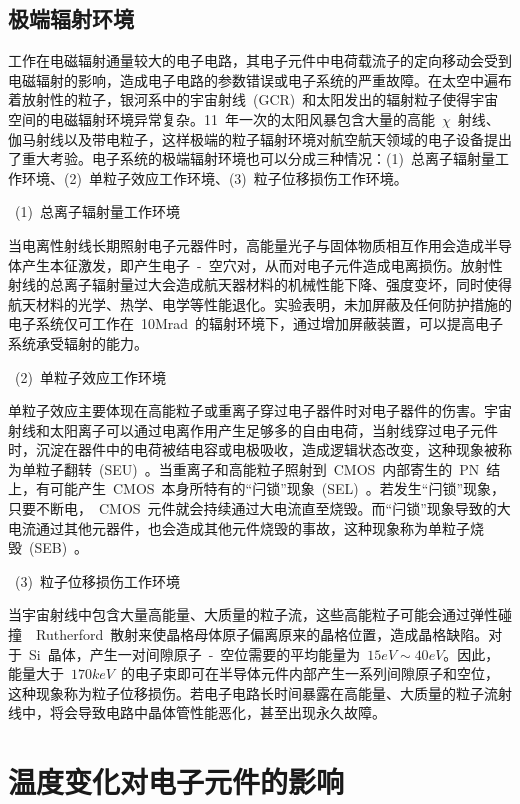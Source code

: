 \subsection{极端辐射环境}
\label{sub:chap2:radiation}
工作在电磁辐射通量较大的电子电路，其电子元件中电荷载流子的定向移动会受到电磁辐射的影响，造成电子电路的参数错误或电子系统的严重故障\cite{Stassinopoulos1988Space,Li2005SpaceRadiation}。在太空中遍布着放射性的粒子，银河系中的宇宙射线~(GCR)~和太阳发出的辐射粒子使得宇宙空间的电磁辐射环境异常复杂。11~年一次的太阳风暴包含大量的高能~$\chi$~射线、伽马射线以及带电粒子\cite{Dodd2010Current}，这样极端的粒子辐射环境对航空航天领域的电子设备提出了重大考验。电子系统的极端辐射环境也可以分成三种情况：(1)~总离子辐射量工作环境、(2)~单粒子效应工作环境、(3)~粒子位移损伤工作环境。

~(1)~总离子辐射量工作环境

当电离性射线长期照射电子元器件时，高能量光子与固体物质相互作用会造成半导体产生本征激发，即产生电子~-~空穴对，从而对电子元件造成电离损伤。放射性射线的总离子辐射量过大会造成航天器材料的机械性能下降、强度变坏，同时使得航天材料的光学、热学、电学等性能退化。实验表明\cite{Son2010GaN}，未加屏蔽及任何防护措施的电子系统仅可工作在~10Mrad~的辐射环境下，通过增加屏蔽装置，可以提高电子系统承受辐射的能力。

~(2)~单粒子效应工作环境

单粒子效应主要体现在高能粒子或重离子穿过电子器件时对电子器件的伤害。宇宙射线和太阳离子可以通过电离作用产生足够多的自由电荷，当射线穿过电子元件时，沉淀在器件中的电荷被结电容或电极吸收，造成逻辑状态改变，这种现象被称为单粒子翻转~(SEU)~\cite{Lum2004New}。当重离子和高能粒子照射到~CMOS~内部寄生的~PN~结上，有可能产生~CMOS~本身所特有的“闩锁”现象~(SEL)~。若发生“闩锁”现象，只要不断电，~CMOS~元件就会持续通过大电流直至烧毁。而“闩锁”现象导致的大电流通过其他元器件，也会造成其他元件烧毁的事故，这种现象称为单粒子烧毁~(SEB)\cite{Sternberg2006Single}~。

~(3)~粒子位移损伤工作环境

当宇宙射线中包含大量高能量、大质量的粒子流，这些高能粒子可能会通过弹性碰撞~\raisebox{0.5mm}{------}~Rutherford~散射来使晶格母体原子偏离原来的晶格位置，造成晶格缺陷。对于~Si~晶体，产生一对间隙原子~-~空位需要的平均能量为~$15eV\sim40eV$。因此，能量大于~$170keV$~的电子束即可在半导体元件内部产生一系列间隙原子和空位，这种现象称为粒子位移损伤。若电子电路长时间暴露在高能量、大质量的粒子流射线中，将会导致电路中晶体管性能恶化，甚至出现永久故障。
\section{温度变化对电子元件的影响}
\label{sec:chap2:temp_ele}

